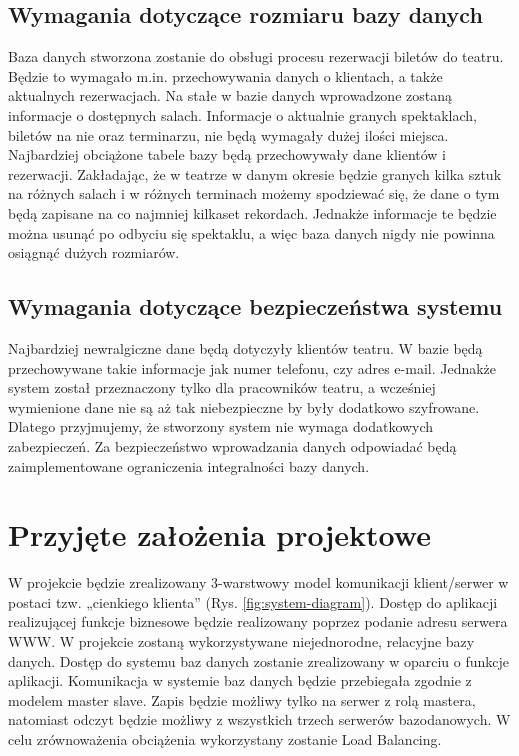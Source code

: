 \documentclass{mgr}
\begin{document}
\subsection{Wymagania dotyczące rozmiaru bazy danych}
Baza danych stworzona zostanie do obsługi procesu rezerwacji biletów do teatru. Będzie to wymagało m.in. przechowywania danych o klientach, a także aktualnych rezerwacjach. Na stałe w bazie danych wprowadzone zostaną informacje o dostępnych salach. Informacje o aktualnie granych spektaklach, biletów na nie oraz terminarzu, nie będą wymagały dużej ilości miejsca. Najbardziej obciążone tabele bazy będą przechowywały dane klientów i rezerwacji. Zakładając, że w teatrze w danym okresie będzie granych kilka sztuk na różnych salach i w różnych terminach możemy spodziewać się, że dane o tym będą zapisane na co najmniej kilkaset rekordach. Jednakże informacje te będzie można usunąć po odbyciu się spektaklu, a więc baza danych nigdy nie powinna osiągnąć dużych rozmiarów.

\subsection{Wymagania dotyczące bezpieczeństwa systemu}
Najbardziej newralgiczne dane będą dotyczyły klientów teatru. W bazie będą przechowywane takie informacje jak numer telefonu, czy adres e-mail. Jednakże system został przeznaczony tylko dla pracowników teatru, a wcześniej wymienione dane nie są aż tak niebezpieczne by były dodatkowo szyfrowane. Dlatego przyjmujemy, że stworzony system nie wymaga dodatkowych zabezpieczeń. Za bezpieczeństwo wprowadzania danych odpowiadać będą zaimplementowane ograniczenia integralności bazy danych.

\section{Przyjęte założenia projektowe}
W projekcie będzie zrealizowany 3-warstwowy model komunikacji klient/serwer w postaci tzw. „cienkiego klienta” (Rys. \ref{fig:system-diagram}). Dostęp  do  aplikacji  realizującej  funkcje  biznesowe  będzie realizowany poprzez podanie adresu serwera WWW. W projekcie zostaną wykorzystywane niejednorodne, relacyjne bazy danych.  Dostęp  do  systemu baz  danych  zostanie zrealizowany  w  oparciu  o funkcje aplikacji. Komunikacja w systemie baz danych będzie przebiegała zgodnie z modelem master slave. Zapis będzie możliwy tylko na serwer z rolą mastera, natomiast odczyt będzie możliwy z wszystkich trzech serwerów bazodanowych. W celu zrównoważenia obciążenia wykorzystany zostanie Load Balancing.
\end{document}
